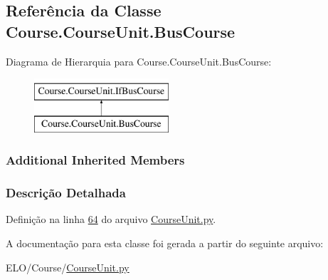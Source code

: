 \hypertarget{classCourse_1_1CourseUnit_1_1BusCourse}{\subsection{Referência da Classe Course.\-Course\-Unit.\-Bus\-Course}
\label{classCourse_1_1CourseUnit_1_1BusCourse}
}
Diagrama de Hierarquia para Course.\-Course\-Unit.\-Bus\-Course\-:\begin{figure}[H]
\begin{center}
\leavevmode
\includegraphics[height=2.000000cm]{d9/d88/classCourse_1_1CourseUnit_1_1BusCourse}
\end{center}
\end{figure}
\subsubsection*{Additional Inherited Members}


\subsubsection{Descrição Detalhada}


Definição na linha \hyperlink{CourseUnit_8py_source_l00064}{64} do arquivo \hyperlink{CourseUnit_8py_source}{Course\-Unit.\-py}.



A documentação para esta classe foi gerada a partir do seguinte arquivo\-:\begin{DoxyCompactItemize}
\item 
E\-L\-O/\-Course/\hyperlink{CourseUnit_8py}{Course\-Unit.\-py}\end{DoxyCompactItemize}
